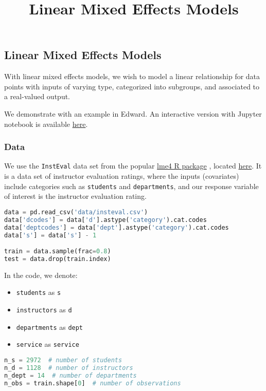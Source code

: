 \title{Linear Mixed Effects Models}

\subsection{Linear Mixed Effects Models}

With linear mixed effects models, we wish to model a linear
relationship for data points with inputs of varying type, categorized
into subgroups, and associated to a real-valued output.

We demonstrate with an example in Edward.
An interactive version with Jupyter notebook is available
\href{http://nbviewer.jupyter.org/github/blei-lab/edward/blob/master/notebooks/linear_mixed_effects_models.ipynb}{here}.

\subsubsection{Data}

We use the \texttt{InstEval} data set from the popular
\href{http://lme4.r-forge.r-project.org}{lme4 R package}
\citep{bates2015fitting}, located
\href{https://github.com/blei-lab/edward/blob/master/notebooks/data/insteval.csv}{here}.
It is a data set of instructor evaluation ratings, where the inputs
(covariates) include categories such as \texttt{students} and
\texttt{departments}, and our response variable of interest is the
instructor evaluation rating.

\begin{lstlisting}[language=Python]
data = pd.read_csv('data/insteval.csv')
data['dcodes'] = data['d'].astype('category').cat.codes
data['deptcodes'] = data['dept'].astype('category').cat.codes
data['s'] = data['s'] - 1

train = data.sample(frac=0.8)
test = data.drop(train.index)
\end{lstlisting}

In the code, we denote:
\begin{itemize}
\item \texttt{students} as \texttt{s}
\item \texttt{instructors} as \texttt{d}
\item \texttt{departments} as \texttt{dept}
\item \texttt{service} as \texttt{service}
\end{itemize}

\begin{lstlisting}[language=Python]
n_s = 2972  # number of students
n_d = 1128  # number of instructors
n_dept = 14  # number of departments
n_obs = train.shape[0]  # number of observations
\end{lstlisting}

